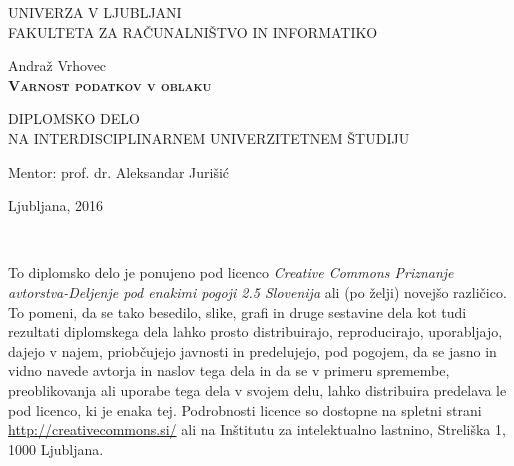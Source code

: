 \documentclass[12pt,a4paper,openany]{book}
\begin{document}
\thispagestyle{empty} 

\begin{center}
{\large 
UNIVERZA V LJUBLJANI\\
FAKULTETA ZA RAČUNALNIŠTVO IN INFORMATIKO\\
}

\vspace{3cm}
{\LARGE Andraž Vrhovec}\\

\vspace{2cm}
\textsc{\textbf{\LARGE 
Varnost podatkov v oblaku
}}

\vspace{2cm}
{ DIPLOMSKO DELO}\\
{ NA INTERDISCIPLINARNEM UNIVERZITETNEM ŠTUDIJU
}


\vspace{2cm} 
{\Large Mentor: prof. dr. Aleksandar Jurišić}

\vfill
{\Large Ljubljana, 2016}
\end{center}

\newpage

\ \thispagestyle{empty}

\newpage


\thispagestyle{empty}

\vspace*{5cm}
{\small \noindent
To diplomsko delo je ponujeno pod licenco \textit{Creative Commons Priznanje avtorstva-Deljenje pod enakimi pogoji 2.5 Slovenija}
ali (po želji) novejšo različico.
To pomeni, da se tako besedilo, slike, grafi in druge sestavine dela kot tudi rezultati diplomskega dela lahko prosto distribuirajo,
reproducirajo, uporabljajo, dajejo v najem, priobčujejo javnosti in predelujejo, pod pogojem, da se jasno in vidno navede avtorja in naslov tega
dela in da se v primeru spremembe, preoblikovanja ali uporabe tega dela v svojem delu, lahko distribuira predelava le pod
licenco, ki je enaka tej.
Podrobnosti licence so dostopne na spletni strani \url{http://creativecommons.si/} ali na Inštitutu za
intelektualno lastnino, Streliška 1, 1000 Ljubljana.

\begin{center}%
  \hspace*{1ex}
\end{center}
}
\end{document}
